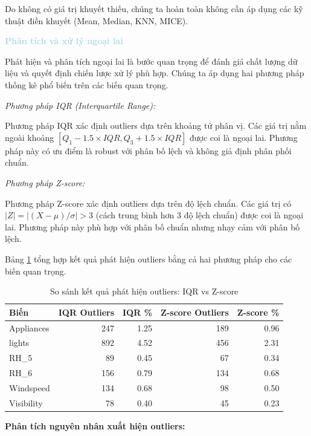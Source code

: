 Do không có giá trị khuyết thiếu, chúng ta hoàn toàn không cần áp dụng các kỹ thuật điền khuyết (Mean, Median, KNN, MICE). 

\vspace{0.5em}
\noindent\textcolor{lightblue}{\textbf{Phân tích và xử lý ngoại lai}}
\vspace{0.5em}

Phát hiện và phân tích ngoại lai là bước quan trọng để đánh giá chất lượng dữ liệu và quyết định chiến lược xử lý phù hợp. Chúng ta áp dụng hai phương pháp thống kê phổ biến trên các biến quan trọng.

\textit{Phương pháp IQR (Interquartile Range):}

Phương pháp IQR xác định outliers dựa trên khoảng tứ phân vị. Các giá trị nằm ngoài khoảng $[Q_1 - 1.5 \times IQR, Q_3 + 1.5 \times IQR]$ được coi là ngoại lai. Phương pháp này có ưu điểm là robust với phân bố lệch và không giả định phân phối chuẩn.

\textit{Phương pháp Z-score:}

Phương pháp Z-score xác định outliers dựa trên độ lệch chuẩn. Các giá trị có $|Z| = |(X - \mu) / \sigma| > 3$ (cách trung bình hơn 3 độ lệch chuẩn) được coi là ngoại lai. Phương pháp này phù hợp với phân bố chuẩn nhưng nhạy cảm với phân bố lệch.

Bảng \ref{tab:outlier_comparison} tổng hợp kết quả phát hiện outliers bằng cả hai phương pháp cho các biến quan trọng.

\begin{table}[H]
\centering
\caption{So sánh kết quả phát hiện outliers: IQR vs Z-score}
\label{tab:outlier_comparison}
\small
\begin{tabular}{lrrrr}
\hline
\textbf{Biến} & \textbf{IQR Outliers} & \textbf{IQR \%} & \textbf{Z-score Outliers} & \textbf{Z-score \%} \\
\hline
Appliances & 247 & 1.25 & 189 & 0.96 \\
lights & 892 & 4.52 & 456 & 2.31 \\
RH\_5 & 89 & 0.45 & 67 & 0.34 \\
RH\_6 & 156 & 0.79 & 134 & 0.68 \\
Windspeed & 134 & 0.68 & 98 & 0.50 \\
Visibility & 78 & 0.40 & 45 & 0.23 \\
\hline
\end{tabular}
\end{table}

\noindent\textbf{Phân tích nguyên nhân xuất hiện outliers:}

